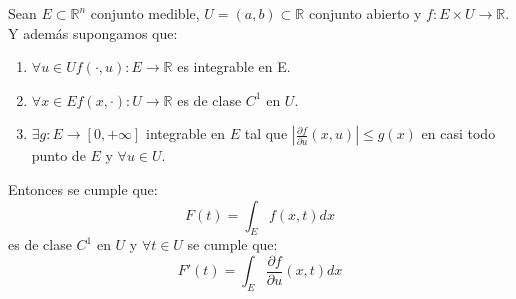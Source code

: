 \begin{teorema}
    Sean $E \subset \mathbb{R}^n$ conjunto medible, $U = (a, b) \subset \mathbb{R}$ conjunto abierto y $f: E \times U \to \mathbb{R}$. Y además supongamos que:
    \begin{enumerate}
        \item $\forall u \in U f(\cdot, u): E \to \mathbb{R}$ es integrable en E.
        \item $\forall x \in E f(x, \cdot): U \to \mathbb{R}$ es de clase $C^1$ en $U$.
        \item $\exists g: E \to [0, +\infty]$ integrable en $E$ tal que $|\frac{\partial f}{\partial u}(x, u)| \leq g(x)$ en casi todo punto de $E$ y $\forall u \in U$.
    \end{enumerate}
    Entonces se cumple que:
    $$ F(t) = \int_{E}f(x,t)dx $$ es de clase $C^1$ en $U$ y $\forall t \in U$ se cumple que: $$ F'(t) = \int_{E}\frac{\partial f}{\partial u}(x, t)dx $$
\end{teorema}
